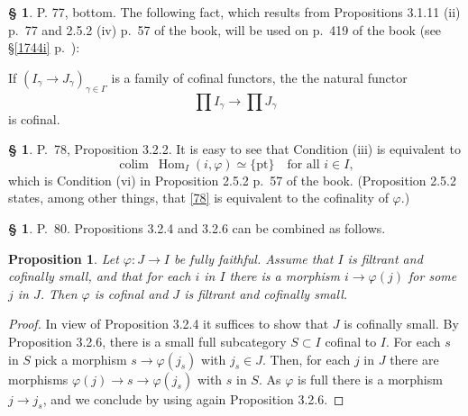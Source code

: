 \documentclass[12pt]{article}%
\newtheorem{prop}[thm]{Proposition}
\theoremstyle{remark}
\theoremstyle{definition}
\newtheorem{s}[thm]{\S}%
\newcommand{\pt}{\{\text{pt}\}}
\DeclareMathOperator*{\colim}{colim}
\DeclareMathOperator{\Hom}{Hom}%
\begin{document}
%

\begin{s}\label{poc}
P. 77, bottom. The following fact, which results from Propositions 3.1.11 (ii) p.~77 and 2.5.2 (iv) p.~57 of the book, will be used on p.~419 of the book (see \S\ref{1744i} p.~\pageref{1744i}):

If $(I_\gamma\to J_\gamma)_{\gamma\in\Gamma}$ is a family of cofinal functors, the the natural functor $$\prod I_\gamma\to\prod J_\gamma$$ is cofinal. 
\end{s}

%

\begin{s} 
P.~78, Proposition 3.2.2. It is easy to see that Condition (iii) is equivalent to
%
\begin{equation}\label{78} 
\colim\ \Hom_I(i,\varphi)\simeq\pt\quad\text{for all }i\in I, 
\end{equation} 
%
which is Condition (vi) in Proposition 2.5.2 p.~57 of the book. (Proposition 2.5.2 states, among other things, that \eqref{78} is equivalent to the cofinality of $\varphi$.)
\end{s}

%

\begin{s} 
P.~80. Propositions 3.2.4 and 3.2.6 can be combined as follows. 

\begin{prop}\label{comb}
Let $\varphi:J\to I$ be fully faithful. Assume that $I$ is filtrant and cofinally small, and that for each $i$ in $I$ there is a morphism $i\to\varphi(j)$ for some $j$ in $J$. Then $\varphi$ is cofinal and $J$ is filtrant and cofinally small. 
\end{prop} 

\begin{proof}
In view of Proposition 3.2.4 it suffices to show that $J$ is cofinally small. By Proposition 3.2.6, there is a small full subcategory $S\subset I$ cofinal to $I$. For each $s$ in $S$ pick a morphism $s\to\varphi(j_s)$ with $j_s\in J$. Then, for each $j$ in $J$ there are morphisms $\varphi(j)\to s\to\varphi(j_s)$ with $s$ in $S$. As $\varphi$ is full there is a morphism $j\to j_s$, and we conclude by using again Proposition 3.2.6.
\end{proof}
\end{s}

%
\end{document}
